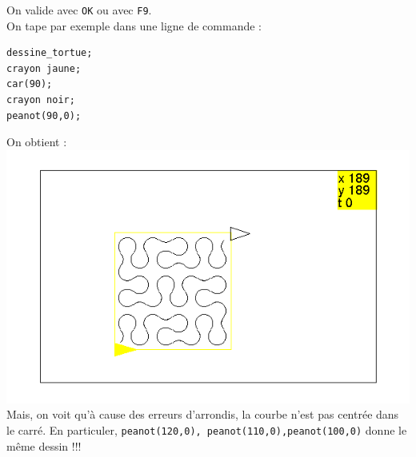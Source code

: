 \documentclass[a4paper,11pt]{book}
\begin{document}
On valide avec {\tt OK} ou avec {\tt F9}.\\
On tape par exemple dans une ligne de commande :\\
\begin{verbatim}
dessine_tortue;
crayon jaune;
car(90);
crayon noir;
peanot(90,0);
\end{verbatim}
On obtient :\\
\includegraphics[width=\textwidth]{tortpeanot1}\\

Mais, on voit qu'\`a cause des erreurs d'arrondis, la courbe n'est pas centr\'ee
dans le carr\'e. En particuler, {\tt peanot(120,0), peanot(110,0),peanot(100,0)}
donne le m\^eme dessin !!!
\end{document}
